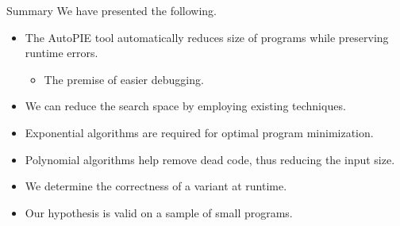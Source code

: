\documentclass{beamer}
\begin{document}
    \begin{frame}{Summary}
      We have presented the following.\\
      \begin{itemize}
          \item The AutoPIE tool automatically reduces size of programs while preserving runtime errors.
          \begin{itemize}
              \item The premise of easier debugging.
          \end{itemize}
          \item We can reduce the search space by employing existing techniques.\\
          \item Exponential algorithms are required for optimal program minimization.\\
          \item Polynomial algorithms help remove dead code, thus reducing the input size.\\
          \item We determine the correctness of a variant at runtime.\\
          \item Our hypothesis is valid on a sample of small programs.\\
      \end{itemize}
      
    \end{frame}
\end{document}
